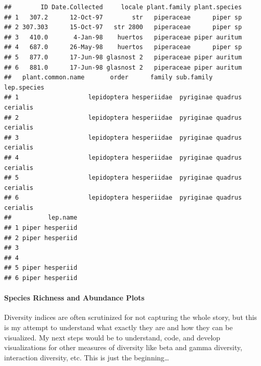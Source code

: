 \documentclass[
]{article}
\begin{document}
\begin{verbatim}
##        ID Date.Collected     locale plant.family plant.species
## 1   307.2      12-Oct-97        str   piperaceae      piper sp
## 2 307.303      15-Oct-97   str 2800   piperaceae      piper sp
## 3   410.0       4-Jan-98    huertos   piperaceae piper auritum
## 4   687.0      26-May-98    huertos   piperaceae      piper sp
## 5   877.0      17-Jun-98 glasnost 2   piperaceae piper auritum
## 6   881.0      17-Jun-98 glasnost 2   piperaceae piper auritum
##   plant.common.name       order      family sub.family      lep.species
## 1                   lepidoptera hesperiidae  pyriginae quadrus cerialis
## 2                   lepidoptera hesperiidae  pyriginae quadrus cerialis
## 3                   lepidoptera hesperiidae  pyriginae quadrus cerialis
## 4                   lepidoptera hesperiidae  pyriginae quadrus cerialis
## 5                   lepidoptera hesperiidae  pyriginae quadrus cerialis
## 6                   lepidoptera hesperiidae  pyriginae quadrus cerialis
##          lep.name
## 1 piper hesperiid
## 2 piper hesperiid
## 3                
## 4                
## 5 piper hesperiid
## 6 piper hesperiid
\end{verbatim}

\hypertarget{species-richness-and-abundance-plots}{%
\paragraph{Species Richness and Abundance
Plots}\label{species-richness-and-abundance-plots}}

Diversity indices are often scrutinized for not capturing the whole
story, but this is my attempt to understand what exactly they are and
how they can be visualized. My next steps would be to understand, code,
and develop visualizations for other measures of diversity like beta and
gamma diversity, interaction diversity, etc. This is just the
beginning\ldots{}
\end{document}

